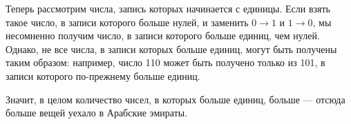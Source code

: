 \begin{itemize}
	Теперь рассмотрим числа, запись которых начинается с единицы. Если взять такое число, в записи которого больше нулей, и заменить $0\rightarrow 1$ и $1\rightarrow 0$, мы несомненно получим число, в записи которого больше единиц, чем нулей. Однако, не все числа, в записи которых больше единиц, могут быть получены таким образом: например, число 110 может быть получено только из 101, в записи которого по-прежнему больше единиц.
	
	Значит, в целом количество чисел, в которых больше единиц, больше — отсюда больше вещей уехало в Арабские эмираты.

\end{itemize}